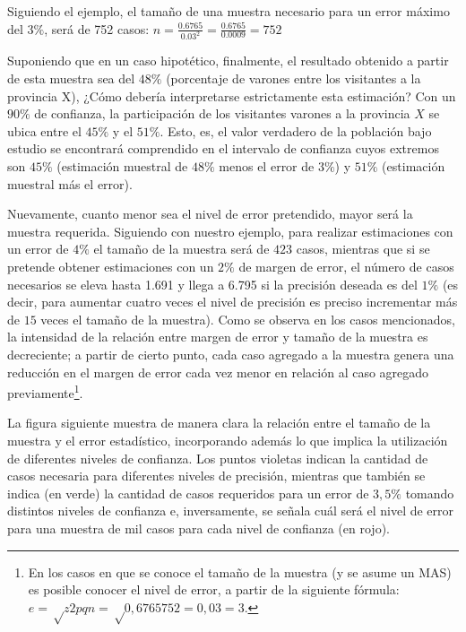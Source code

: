 \documentclass[
]{book}
\begin{document}
Siguiendo el ejemplo, el tamaño de una muestra necesario para un error máximo del \(3\%\), será de 752 casos: \(n = \frac{0.6765}{0.03^2} = \frac{0.6765}{0.0009} = 752\)

Suponiendo que en un caso hipotético, finalmente, el resultado obtenido a partir de esta muestra sea del \(48\%\) (porcentaje de varones entre los visitantes a la provincia X), ¿Cómo debería interpretarse estrictamente esta estimación? Con un \(90\%\) de confianza, la participación de los visitantes varones a la provincia \(X\) se ubica entre el \(45\%\) y el \(51\%\). Esto, es, el valor verdadero de la población bajo estudio se encontrará comprendido en el intervalo de confianza cuyos extremos son \(45\%\) (estimación muestral de \(48\%\) menos el error de \(3\%\)) y \(51\%\) (estimación muestral más el error).

Nuevamente, cuanto menor sea el nivel de error pretendido, mayor será la muestra requerida. Siguiendo con nuestro ejemplo, para realizar estimaciones con un error de \(4\%\) el tamaño de la muestra será de \(423\) casos, mientras que si se pretende obtener estimaciones con un \(2\%\) de margen de error, el número de casos necesarios se eleva hasta 1.691 y llega a 6.795 si la precisión deseada es del \(1\%\) (es decir, para aumentar cuatro veces el nivel de precisión es preciso incrementar más de \(15\) veces el tamaño de la muestra). Como se observa en los casos mencionados, la intensidad de la relación entre margen de error y tamaño de la muestra es decreciente; a partir de cierto punto, cada caso agregado a la muestra genera una reducción en el margen de error cada vez menor en relación al caso agregado previamente\footnote{En los casos en que se conoce el tamaño de la muestra (y se asume un MAS) es posible conocer el nivel de error, a partir de la siguiente fórmula: \(e=√z2pqn=√0,6765752=0,03=3%
  \).}.

La figura siguiente muestra de manera clara la relación entre el tamaño de la muestra y el error estadístico, incorporando además lo que implica la utilización de diferentes niveles de confianza. Los puntos violetas indican la cantidad de casos necesaria para diferentes niveles de precisión, mientras que también se indica (en verde) la cantidad de casos requeridos para un error de \(3,5\%\) tomando distintos niveles de confianza e, inversamente, se señala cuál será el nivel de error para una muestra de mil casos para cada nivel de confianza (en rojo).
\end{document}
